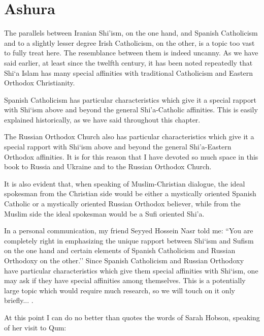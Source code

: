 \section{Ashura}

The parallels between Iranian Shi'ism, on the one hand, and Spanish Catholicism and to a slightly lesser degree Irish Catholicism, on the other, is a topic too vast to fully treat here. The resemblance between them is indeed uncanny. As we have said earlier, at least since the twelfth century, it has been noted repeatedly that Shi`a Islam has many special affinities with traditional Catholicism and Eastern Orthodox Christianity.

Spanish Catholicism has particular characteristics which give it a special rapport with Shi`ism above and beyond the general Shi'a-Catholic affinities. This is easily explained historically, as we have said throughout this chapter.

The Russian Orthodox Church also has particular characteristics which give it a special rapport with Shi`ism above and beyond the general Shi'a-Eastern Orthodox affinities. It is for this reason that I have devoted so much space in this book to Russia and Ukraine and to the Russian Orthodox Church.

It is also evident that, when speaking of Muslim-Christian dialogue, the ideal spokesman from the Christian side would be either a mystically oriented Spanish Catholic or a mystically oriented Russian Orthodox believer, while from the Muslim side the ideal spokesman would be a Sufi oriented Shi'a.

In a personal communication, my friend Seyyed Hossein Nasr told me: ``You are completely right in emphasizing the unique rapport between Shi`ism and Sufism on the one hand and certain elements of Spanish Catholicism and Russian Orthodoxy on the other.'' Since Spanish Catholicism and Russian Orthodoxy have particular characteristics which give them special affinities with Shi`ism, one may ask if they have special affinities among themselves. This is a potentially large topic which would require much research, so we will touch on it only briefly... .

At this point I can do no better than quotes the words of Sarah Hobson, speaking of her visit to Qum:


